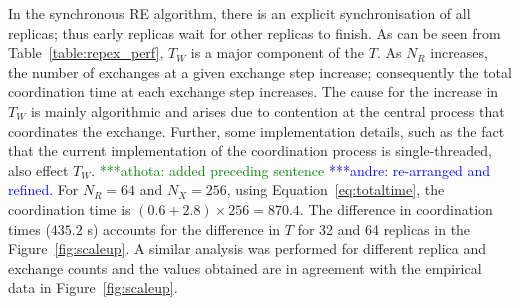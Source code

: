 \documentclass{rspublic}
\newcommand{\jhanote}[1]{ {\textcolor{red} { ***shantenu: #1 }}}
\newcommand{\alnote}[1]{ {\textcolor{blue} { ***andre: #1 }}}
\newcommand{\athotanote}[1]{ {\textcolor{green} { ***athota: #1 }}}
\newcommand{\alnote}[1]{}
\newcommand{\athotanote}[1]{}
\newcommand{\jhanote}[1]{}
\begin{document}
 
In the synchronous RE algorithm, there is an explicit synchronisation of all
replicas; thus early replicas wait for other replicas to finish. As can be seen
from Table~\ref{table:repex_perf}, $T_W$ is a major component of the $T$.  As
$N_R$ increases, the number of exchanges at a given exchange step increase;
consequently the total coordination time at each exchange step increases.  
The cause for the increase in $T_W$ is mainly algorithmic and arises due
to contention at the central process that coordinates the exchange. Further,
some implementation details, such as the fact that the current implementation
of the coordination process is single-threaded, also effect $T_W$.
\athotanote{added preceding sentence}\alnote{re-arranged and refined.}
For $N_R = 64$ and $N_X = 256$, using Equation~\ref{eq:totaltime}, the coordination
time is $(0.6+2.8) \times 256 = 870.4$.  The difference in coordination times
($435.2$ s) accounts for the difference in $T$ for 32 and 64 replicas in the
Figure~\ref{fig:scaleup}.  %
A similar analysis was performed for different replica and exchange counts and the
values obtained are in agreement with the empirical data in
Figure~\ref{fig:scaleup}.



\end{document}
